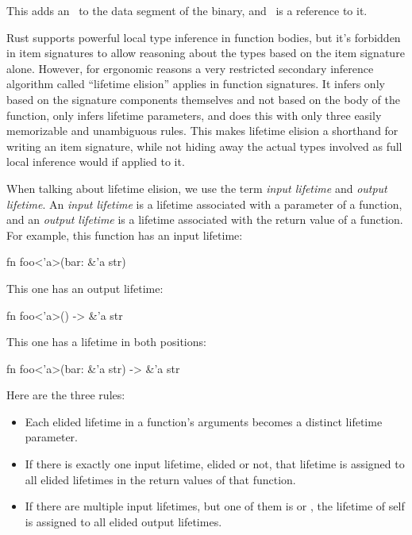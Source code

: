This adds an \itt\ to the data segment of the binary, and \x\ is a reference to it.

\label{paragraph:lifetime_elision}

Rust supports powerful local type inference in function bodies, but it's forbidden in item signatures to allow reasoning about the 
types based on the item signature alone. However, for ergonomic reasons a very restricted secondary inference algorithm called 
\enquote{lifetime elision} applies in function signatures. It infers only based on the signature components themselves and not based 
on the body of the function, only infers lifetime parameters, and does this with only three easily memorizable and unambiguous rules. 
This makes lifetime elision a shorthand for writing an item signature, while not hiding away the actual types involved as full local
inference would if applied to it.

\blank

When talking about lifetime elision, we use the term \emph{input lifetime} and \emph{output lifetime}. An \emph{input lifetime} is 
a lifetime associated with a parameter of a function, and an \emph{output lifetime} is a lifetime associated with the return value 
of a function. For example, this function has an input lifetime:

\begin{rustc}
fn foo<'a>(bar: &'a str)
\end{rustc}

This one has an output lifetime:

\begin{rustc}
fn foo<'a>() -> &'a str
\end{rustc}

This one has a lifetime in both positions:

\begin{rustc}
fn foo<'a>(bar: &'a str) -> &'a str
\end{rustc}

Here are the three rules:

\begin{itemize}
  \item{Each elided lifetime in a function's arguments becomes a distinct lifetime parameter.}
  \item{If there is exactly one input lifetime, elided or not, that lifetime is assigned to all elided lifetimes in the return 
      values of that function.}
  \item{If there are multiple input lifetimes, but one of them is  or , the lifetime of self is 
      assigned to all elided output lifetimes.}
\end{itemize}

